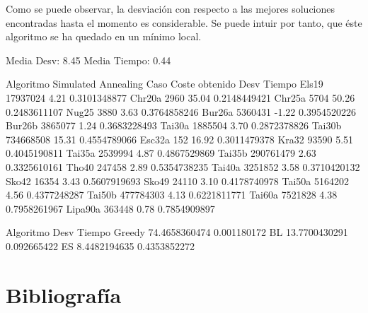 \documentclass[10pt,a4paper]{article}
\begin{document}
Como se puede observar, la desviación con respecto a las mejores soluciones encontradas hasta el momento es considerable. Se puede intuir por tanto, que éste algoritmo se ha quedado en un mínimo local.

\begin{ccode}
Media Desv: 8.45
Media Tiempo: 0.44

Algoritmo Simulated Annealing           
Caso    Coste obtenido  Desv    Tiempo
Els19   17937024    4.21    0.3101348877
Chr20a  2960    35.04   0.2148449421
Chr25a  5704    50.26   0.2483611107
Nug25   3880    3.63    0.3764858246
Bur26a  5360431 -1.22   0.3954520226
Bur26b  3865077 1.24    0.3683228493
Tai30a  1885504 3.70    0.2872378826
Tai30b  734668508   15.31   0.4554789066
Esc32a  152 16.92   0.3011479378
Kra32   93590   5.51    0.4045190811
Tai35a  2539994 4.87    0.4867529869
Tai35b  290761479   2.63    0.3325610161
Tho40   247458  2.89    0.5354738235
Tai40a  3251852 3.58    0.3710420132
Sko42   16354   3.43    0.5607919693
Sko49   24110   3.10    0.4178740978
Tai50a  5164202 4.56    0.4377248287
Tai50b  477784303   4.13    0.6221811771
Tai60a  7521828 4.38    0.7958261967
Lipa90a 363448  0.78    0.7854909897
\end{ccode}

\begin{ccode}
Algoritmo   Desv    Tiempo
Greedy  74.4658360474   0.001180172
BL  13.7700430291   0.092665422
ES  8.4482194635    0.4353852272
\end{ccode}


\section*{Bibliografía}
\printbibliography[heading=bibempty,type=article]
\printbibliography[heading=bibempty,type=misc]
\end{document}
